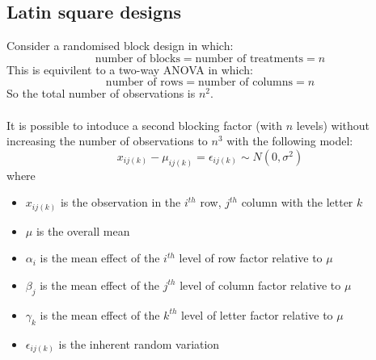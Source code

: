     \subsection{Latin square designs}
        Consider a randomised block design in which:
        $$ \text{number of blocks} = \text{number of treatments} = n $$
        This is equivilent to a two-way ANOVA in which:
        $$ \text{number of rows} = \text{number of columns} = n $$
        So the total number of observations is $n^2$.\\
        \\
        It is possible to intoduce a second blocking factor (with $n$ levels) without increasing the number of observations to $n^3$ with the following model:
        $$
        x_{ij(k)} - \mu_{ij(k)} = \epsilon_{ij(k)} \sim N(0, \sigma^2)
        $$
        where 
        \begin{itemize}
        \item $x_{ij(k)}$ is the observation in the $i^{th}$ row, $j^{th}$ column with the letter $k$
        \item $\mu$ is the overall mean
        \item $\alpha_i$ is the mean effect of the $i^{th}$ level of row factor relative to $\mu$
        \item $\beta_j$ is the mean effect of the $j^{th}$ level of column factor relative to $\mu$
        \item $\gamma_k$ is the mean effect of the $k^{th}$ level of letter factor relative to $\mu$
        \item $\epsilon_{ij(k)}$ is the inherent random variation 
        \end{itemize}

